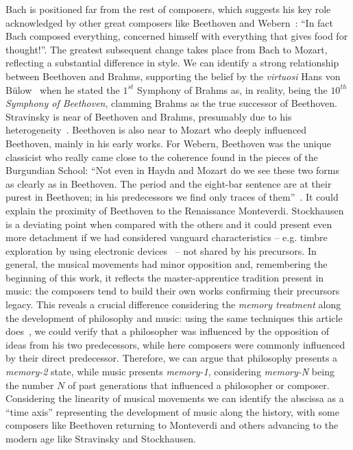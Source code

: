 \documentclass[
 aip,
 jmp,
 amsmath,amssymb,
 reprint,
]{revtex4-1}
\begin{document}
Bach is positioned far from the rest of
composers, which suggests his key role
acknowledged by other great composers like Beethoven and
Webern~\cite{Webern}: ``In fact Bach composed everything, concerned
himself with everything that gives food for thought!''. 
The greatest subsequent change takes place from Bach to Mozart,
reflecting a substantial difference in style.
We can identify a strong relationship between
Beethoven and Brahms, supporting the belief by the \textit{virtuosi} Hans von B\"{u}low~\cite{Bulow} when he
stated the $1^{st}$ Symphony of Brahms as, in reality, being the \textit{$10^{th}$ Symphony of
Beethoven}, clamming Brahms as the true successor of
Beethoven. Stravinsky is near of Beethoven and Brahms,
presumably due to his heterogeneity~\cite{BennettHistory,
  Lovelock}. Beethoven is also near to Mozart who deeply influenced
Beethoven, mainly in his early works.
For Webern, Beethoven was the unique classicist who really came close
to the coherence found in the pieces of the Burgundian School: ``Not even
in Haydn and Mozart do we see these two forms as clearly as in
Beethoven. The period and the eight-bar sentence are at their purest
in Beethoven; in his predecessors we find only traces of them''~\cite{Webern}. It
could explain the proximity of Beethoven to the Renaissance  Monteverdi.
Stockhausen is a deviating point when compared with the others and it
could present even more detachment if we had considered
vanguard characteristics -- e.g. timbre exploration by using
electronic devices~\cite{Lovelock} -- not
shared by his precursors.
In general, the musical movements had minor opposition and,
remembering the beginning of this work, it reflects the
master-apprentice
tradition present in music: the composers tend to build their own
works confirming their precursors legacy. 
This reveals a crucial difference %
considering the \textit{memory treatment} along the development of
philosophy and music: using the same techniques this article does~\cite{Fabbri},
we could verify that a philosopher was influenced by the
opposition of ideas from his two predecessors, while here composers were commonly
influenced by their direct predecessor. Therefore, we can argue that philosophy
presents a \textit{memory-2} state, while music presents
\textit{memory-1}, considering \textit{memory-N} being the number $N$
of past generations that influenced a philosopher or
composer. Considering the linearity of musical movements we can
identify the abscissa as a ``time axis'' representing the development
of music along the history, with some composers
like Beethoven returning to Monteverdi and others advancing to the
modern age like Stravinsky and Stockhausen.
\end{document}
